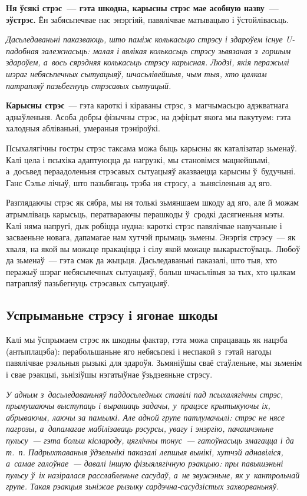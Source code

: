\textbf{Ня ўсякі стрэс~--- гэта шкодна, карысны стрэс мае асобную назву~--- эўстрэс.} Ён забясьпечвае нас энэргіяй, павялічвае матывацыю і ўстойлівасьць. 

\emph{Дасьледаваньні паказваюць, што паміж колькасьцю стрэсу і здароўем існуе U-падобная залежнасьць: малая і вялікая колькасьць стрэсу зьвязаная з~горшым здароўем, а~вось сярэдняя колькасьць стрэсу карысная. Людзі, якія перажылі шэраг небясьпечных сытуацыяў, шчасьлівейшыя, чым тыя, хто цалкам патрапляў пазьбегнуць стрэсавых сытуацый.}

\textbf{Карысны стрэс}~--- гэта кароткі і кіраваны стрэс, з~магчымасьцю адэкватнага аднаўленьня. Асоба добры фізычны стрэс, на дэфіцыт якога мы пакутуем: гэта халодныя абліваньні, умераныя трэніроўкі.

Псыхалягічны гостры стрэс таксама можа быць карысны як каталізатар зьменаў. Калі цела і псыхіка адаптуюцца да нагрузкі, мы становімся мацнейшымі, а~досьвед пераадоленьня стрэсавых сытуацыяў аказваецца карысны ў~будучыні. Ганс Сэлье лічыў, што пазьбягаць трэба ня стрэсу, а~зьнясіленьня ад яго.

Разглядаючы стрэс як сябра, мы ня толькі зьмяншаем шкоду ад яго, але й можам атрымліваць карысьць, ператвараючы перашкоды ў~сродкі дасягненьня мэты. Калі няма напругі, дык робіцца нудна: кароткі стрэс павялічвае навучаньне і засваеньне новага, дапамагае нам хутчэй прымаць зьмены. Энэргія стрэсу~--- як хваля, на якой вы можаце пракаціцца і сілу якой можаце выкарыстоўваць. Любоў да зьменаў~--- гэта смак да жыцьця. Дасьледаваньні паказалі, што тыя, хто перажыў шэраг небясьпечных сытуацыяў, больш шчасьлівыя за тых, хто цалкам патрапляў пазьбегнуць стрэсавых сытуацыяў.

\subsection*{Успрыманьне стрэсу і ягонае шкоды}

Калі мы ўспрымаем стрэс як шкодны фактар, гэта можа спрацаваць як нацэба (антыплацэба): перабольшаньне яго небясьпекі і неспакой з~гэтай нагоды павялічвае рэальныя рызыкі для здароўя. Зьмяніўшы сваё стаўленьне, мы зьменім і свае рэакцыі, зьнізіўшы нэгатыўнае ўзьдзеяньне стрэсу.

\emph{У адным з~дасьледаваньняў паддосьледных ставілі пад псыхалягічны стрэс, прымушаючы выступаць і вырашаць задачы, у~працэсе крытыкуючы іх, абрываючы, лаючы за памылкі. Але адной групе патлумачылі: стрэс не нясе пагрозы, а~дапамагае мабілізаваць рэсурсы, увагу і энэргію, пачашчэньне пульсу~--- гэта больш кіслароду, цяглічны тонус~--- гатоўнасьць змагацца і да т.~п. Падрыхтаваныя ўдзельнікі паказалі лепшыя вынікі, хутчэй аднавіліся, а~самае галоўнае~--- давалі іншую фізыялягічную рэакцыю: пры павышэньні пульсу ў~іх назіралася расслабленьне сасудаў, а~не звужэньне, як у~кантрольнай групе. Такая рэакцыя зьніжае рызыку сардэчна-сасудзістых захворваньняў.}

